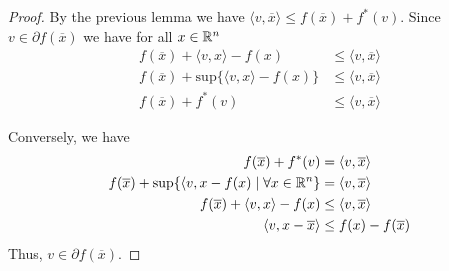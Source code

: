 \begin{definition}
\begin{proof}
\item By the previous lemma we have $\langle v, \overline{x} \rangle \leq f(\overline{x}) + f^*(v)$. Since $v \in \partial f(\overline{x})$ we have for all $x \in \Bbb R^n$
\begin{align*}
f(\overline{x}) + \langle v, x \rangle - f(x) &\leq \langle v, \overline{x} \rangle \\
f(\overline{x}) + \mathrm{sup}\{ \langle v, x \rangle - f(x) \} &\leq \langle v, \overline{x} \rangle \\
f(\overline{x}) + f^*(v) &\leq \langle v, \overline{x} \rangle
\end{align*}

Conversely, we have 
\begin{align*}
f(\overline{x}) + f^*(v) &= \langle v, \overline{x} \rangle \\
f(\overline{x}) + \mathrm{sup}\{ \langle v, x - f(x) \mid \forall x \in \Bbb R^n \} &= \langle v, \overline{x} \rangle \\
f(\overline{x}) + \langle v, x \rangle - f(x) &\leq \langle v, \overline{x} \rangle \\
\langle v, x - \overline{x} \rangle &\leq f(x) - f(\overline{x})
\end{align*}
Thus, $v \in \partial f(\overline{x})$.
\end{proof}

\end{definition}
